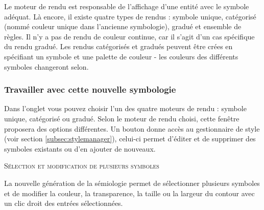 
Le moteur de rendu est responsable de l'affichage d'une entité avec le symbole 
adéquat. Là encore, il existe quatre types de rendus : symbole unique, catégorisé 
(nommé couleur unique dans l'ancienne symbologie), gradué et ensemble de règles. Il n'y a pas de rendu 
de couleur continue, car il s'agit d'un cas spécifique du rendu gradué. Les rendus 
catégorisés et gradués peuvent être crées en spécifiant un symbole et une palette 
de couleur - les couleurs des différents symboles changeront selon.

\subsubsection{Travailler avec cette nouvelle symbologie}\label{new_generation_sym}

Dans l'onglet  vous pouvez choisir l'un des quatre moteurs de rendu :
symbole unique, catégorisé ou gradué. Selon le moteur de rendu choisi, cette fenêtre 
proposera des options différentes. Un bouton  
donne accès au gestionnaire de style (voir section \ref{subsec:stylemanager}), 
celui-ci permet d'éditer et de supprimer des symboles existants ou d'en ajouter
de nouveaux.

\begin{Tip}\caption{\textsc{Sélection et modification de plusieurs symboles}} 
La nouvelle génération de la sémiologie permet de sélectionner plusieurs symboles et 
de modifier la couleur, la transparence, la taille ou la largeur du contour avec 
un clic droit des entrées sélectionnées.
\end{Tip}


